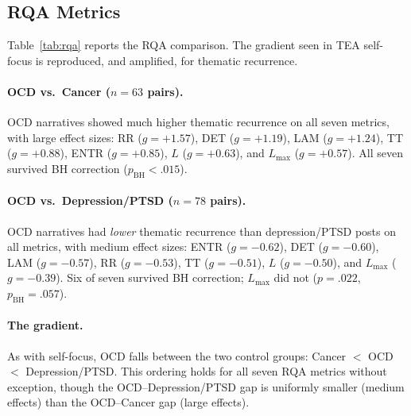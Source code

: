\documentclass[11pt,a4paper]{article}
\begin{document}
\subsection{RQA Metrics}

Table~\ref{tab:rqa} reports the RQA comparison. The gradient seen in TEA self-focus is reproduced, and amplified, for thematic recurrence.

\paragraph{OCD vs.\ Cancer ($n = 63$ pairs).}
OCD narratives showed much higher thematic recurrence on all seven metrics, with large effect sizes: RR ($g = +1.57$), DET ($g = +1.19$), LAM ($g = +1.24$), TT ($g = +0.88$), ENTR ($g = +0.85$), $L$ ($g = +0.63$), and $L_\mathrm{max}$ ($g = +0.57$). All seven survived BH correction ($p_\mathrm{BH} < .015$).

\paragraph{OCD vs.\ Depression/PTSD ($n = 78$ pairs).}
OCD narratives had \emph{lower} thematic recurrence than depression/PTSD posts on all metrics, with medium effect sizes: ENTR ($g = -0.62$), DET ($g = -0.60$), LAM ($g = -0.57$), RR ($g = -0.53$), TT ($g = -0.51$), $L$ ($g = -0.50$), and $L_\mathrm{max}$ ($g = -0.39$). Six of seven survived BH correction; $L_\mathrm{max}$ did not ($p = .022$, $p_\mathrm{BH} = .057$).

\paragraph{The gradient.}
As with self-focus, OCD falls between the two control groups: Cancer $<$ OCD $<$ Depression/PTSD. This ordering holds for all seven RQA metrics without exception, though the OCD--Depression/PTSD gap is uniformly smaller (medium effects) than the OCD--Cancer gap (large effects).
\end{document}
